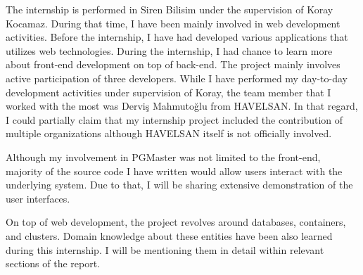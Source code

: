 The internship is performed in Siren Bilisim under the supervision of Koray 
Kocamaz. During that time, I have been mainly involved in web development 
activities. Before the internship, I have had developed various applications 
that utilizes web technologies. During the internship, I had chance to learn 
more about front-end development on top of back-end. The project mainly involves 
active participation of three developers. While I have performed my day-to-day 
development activities under supervision of Koray, the team member that I 
worked with the most was Derviş Mahmutoğlu from HAVELSAN. In that regard, I 
could partially claim that my internship project included the contribution of 
multiple organizations although HAVELSAN itself is not officially involved.
\par
Although my involvement in PGMaster was not limited to the front-end, majority 
of the source code I have written would allow users interact with the 
underlying system. Due to that, I will be sharing extensive demonstration of 
the user interfaces.
\par
On top of web development, the project revolves around databases, containers, 
and clusters. Domain knowledge about these entities have been also learned 
during this internship. I will be mentioning them in detail within relevant 
sections of the report.